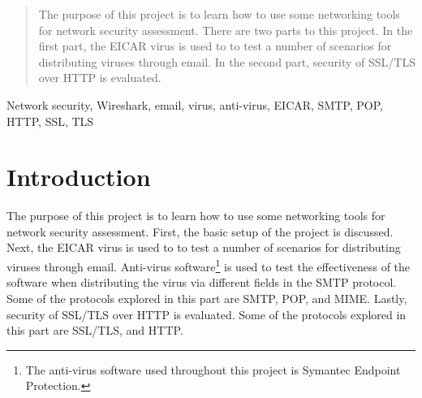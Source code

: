 \documentclass[10pt,conference]{IEEEtran}
\begin{document}
\maketitle

\begin{abstract}
The purpose of this project is to learn how to use some networking tools for network security assessment. There
are two parts to this project. In the first part, the EICAR virus is used to to test a number of scenarios for distributing
viruses through email. In the second part, security of SSL/TLS over HTTP is evaluated.
\end{abstract}

\begin{IEEEkeywords}
Network security, Wireshark, email, virus, anti-virus, EICAR, SMTP, POP, HTTP, SSL, TLS
\end{IEEEkeywords}



%
\IEEEpeerreviewmaketitle



\section{Introduction}
The purpose of this project is to learn how to use some networking tools for network security assessment. First, the basic setup
of the project is discussed. Next, the EICAR virus is used to to test a number of scenarios for distributing
viruses through email. Anti-virus software\footnote{The anti-virus software used throughout this project is Symantec Endpoint Protection.}
is used to test the effectiveness of the software when distributing the virus
via different fields in the SMTP protocol.  Some of the protocols explored in this part are SMTP, POP, and MIME. Lastly,
security of SSL/TLS over HTTP is evaluated. Some of the protocols explored in this part are SSL/TLS, and HTTP.
\end{document}
